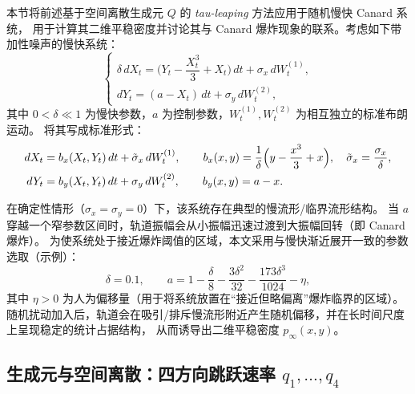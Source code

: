 	本节将前述基于空间离散生成元 \(Q\) 的 \textit{tau-leaping} 方法应用于随机慢快 Canard 系统，
	用于计算其二维平稳密度并讨论其与 Canard 爆炸现象的联系。考虑如下带加性噪声的慢快系统：
	\begin{equation}\label{eq:canard_sde}
		\begin{cases}
			\delta\, dX_t = \bigl(Y_t - \dfrac{X_t^3}{3} + X_t\bigr)\,dt + \sigma_x\, dW_t^{(1)},\\[6pt]
			dY_t = (a - X_t)\,dt + \sigma_y\, dW_t^{(2)},
		\end{cases}
	\end{equation}
	其中 \(0<\delta\ll 1\) 为慢快参数，\(a\) 为控制参数，\(W_t^{(1)},W_t^{(2)}\) 为相互独立的标准布朗运动。
	将其写成标准形式：
	\begin{equation}\label{eq:canard_standard}
		\begin{aligned}
			dX_t &= b_x(X_t,Y_t)\,dt + \tilde\sigma_x\, dW_t^{(1)},\qquad
			b_x(x,y)=\frac{1}{\delta}\Bigl(y-\frac{x^3}{3}+x\Bigr),\quad \tilde\sigma_x=\frac{\sigma_x}{\delta},\\
			dY_t &= b_y(X_t,Y_t)\,dt + \sigma_y\, dW_t^{(2)},\qquad
			b_y(x,y)=a-x .
		\end{aligned}
	\end{equation}
	
	在确定性情形（\(\sigma_x=\sigma_y=0\)）下，该系统存在典型的慢流形/临界流形结构。
	当 \(a\) 穿越一个窄参数区间时，轨道振幅会从小振幅迅速过渡到大振幅回转（即 Canard 爆炸）。
	为使系统处于接近爆炸阈值的区域，本文采用与慢快渐近展开一致的参数选取（示例）：
	\begin{equation}\label{eq:canard_param}
		\delta=0.1,\qquad
		a = 1 - \frac{\delta}{8} - \frac{3\delta^2}{32} - \frac{173\delta^3}{1024} - \eta,
	\end{equation}
	其中 \(\eta>0\) 为人为偏移量（用于将系统放置在“接近但略偏离”爆炸临界的区域）。
	随机扰动加入后，轨道会在吸引/排斥慢流形附近产生随机偏移，并在长时间尺度上呈现稳定的统计占据结构，
	从而诱导出二维平稳密度 \(p_\infty(x,y)\)。
	
	\subsection{生成元与空间离散：四方向跳跃速率 \(q_1,\dots,q_4\)}
	
